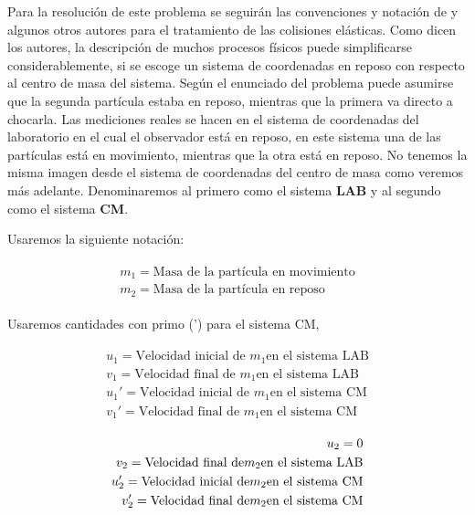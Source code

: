 \documentclass[a4paper,10pt]{article}
\begin{document}
Para la resolución de este problema se seguirán las convenciones y notación de \cite{marion} y algunos
otros autores para el tratamiento de las colisiones elásticas. Como dicen los autores, 
la descripción de muchos procesos físicos puede simplificarse considerablemente, si se 
escoge un sistema de coordenadas en reposo con respecto al centro de masa del sistema. Según
el enunciado del problema puede asumirse que la segunda partícula estaba en reposo, mientras
que la primera va directo a chocarla. Las mediciones reales se hacen en el sistema de coordenadas
del laboratorio en el cual el observador está en reposo, en este sistema una de las partículas
está en movimiento, mientras que la otra está en reposo. No tenemos la misma imagen desde el
sistema de coordenadas del centro de masa como veremos más adelante. Denominaremos al primero como el sistema \textbf{LAB}
y al segundo como el sistema \textbf{CM}.


\vspace{.3cm}

Usaremos la siguiente notación:

 \begin{gather}
 \begin{split}
% 
  m_1 = \text{Masa de la partícula en movimiento} \\
  m_2 = \text{Masa de la partícula en reposo}
%  
  \label{eq:masas}
%  
 \end{split}
 \end{gather}

Usaremos cantidades con primo (') para el sistema CM,

 \begin{gather}
 \begin{split}
  u_1 = \text{Velocidad inicial de } m_1 \text{en el sistema LAB} \\
  v_1 = \text{Velocidad final de } m_1 \text{en el sistema LAB} \\
%   
  u_1' = \text{Velocidad inicial de } m_1 \text{en el sistema CM} \\
  v_1' = \text{Velocidad final de } m_1 \text{en el sistema CM}
% 
 \label{eq:velMasa1}
 \end{split}
 \end{gather}

  \begin{gather}
  \begin{split}
   u_2 = 0 \\
   v_2 = \textrm{Velocidad final de} m_2 \textrm{en el sistema LAB} \\
%  
 \vspace{.2cm}
%  
  u_2' = \textrm{Velocidad inicial de} m_2 \textrm{en el sistema CM} \\
  v_2' = \textrm{Velocidad final de} m_2 \textrm{en el sistema CM}
%  
  \label{eq:velMasa2}
  \end{split}
 \end{gather}
 
\end{document}
